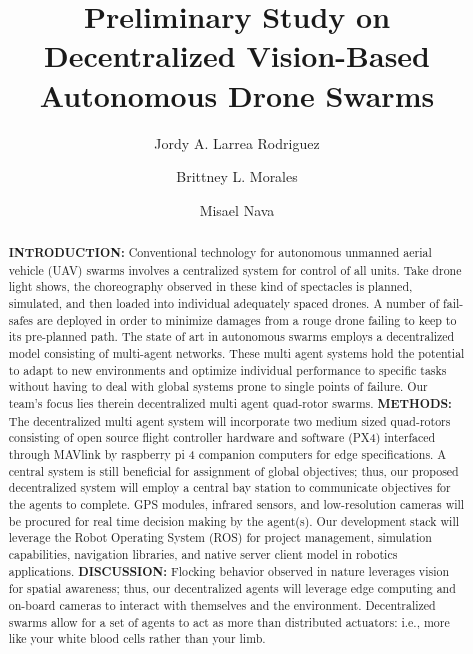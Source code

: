 \documentclass[%
 aip,
cp,  %
 amsmath,amssymb,%
 reprint,%
]{revtex4-2}
\begin{document}
\title{Preliminary Study on Decentralized Vision-Based Autonomous Drone Swarms}%

\author{Jordy A. Larrea Rodriguez} %

\author{Brittney L. Morales}%

\author{Misael Nava}

\begin{abstract}

\textbf{INTRODUCTION: } Conventional technology for autonomous unmanned aerial vehicle (UAV) swarms involves a centralized system for control of all units. Take drone light shows, the choreography observed in these kind of spectacles is planned, simulated, and then loaded into individual adequately spaced drones. A number of fail-safes are deployed in order to minimize damages from a rouge drone failing to keep to its pre-planned path. The state of art in autonomous swarms employs a decentralized model consisting of multi-agent networks. These multi agent systems hold the potential to adapt to new environments and optimize individual performance to specific tasks without having to deal with global systems prone to single points of failure. Our team's focus lies therein decentralized multi agent quad-rotor swarms.    
\newline\textbf{METHODS: } The decentralized multi agent system will incorporate two medium sized quad-rotors consisting of open source flight controller hardware and software (PX4) interfaced through MAVlink by raspberry pi 4 companion computers for edge specifications. A central system is still beneficial for assignment of global objectives; thus, our proposed decentralized system will employ a central bay station to communicate objectives for the agents to complete. GPS modules, infrared sensors, and low-resolution cameras will be procured for real time decision making by the agent(s). Our development stack will leverage the Robot Operating System (ROS) for project management, simulation capabilities, navigation libraries, and native server client model in robotics applications.  
\newline\textbf{DISCUSSION: } Flocking behavior observed in nature leverages vision for spatial awareness; thus, our decentralized agents will leverage edge computing and on-board cameras to interact with themselves and the environment. Decentralized swarms allow for a set of agents to act as more than distributed actuators: i.e., more like your white blood cells rather than your limb. 

\end{abstract}
\end{document}
